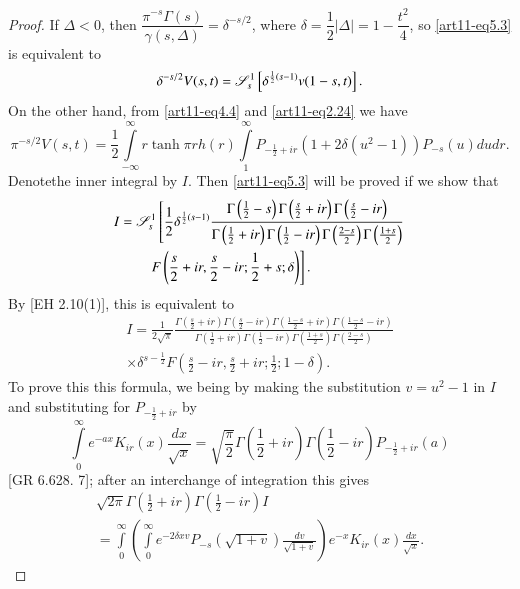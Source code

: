 \begin{proof}
If  $\Delta < 0$, then $\dfrac{\pi^{-s} \Gamma (s)}{\gamma (s, \Delta)} = \delta^{-s/2}$, where $\delta = \dfrac{1}{2} |\Delta| = 1 -\dfrac{t^2}{4}$, so \eqref{art11-eq5.3} is equivalent to 
$$
\delta^{-s/2} V (s,t) = \mathscr{S}^1_s \left[\delta^{\frac{1}{2} (s-1)}  v(1 - s, t)\right].
$$
On the other hand, from \eqref{art11-eq4.4} and \eqref{art11-eq2.24} we have 
$$
\pi^{-s/2} V (s,t) = \frac{1}{2} \int\limits^\infty_{-\infty} r \tanh \pi r h(r) \int\limits^\infty_{1} P_{-\frac{1}{2}+ ir} (1+ 2 \delta (u^2 -1)) P_{-s} (u) du dr. 
$$
Denote\pageoriginale the inner integral by $I$. Then \eqref{art11-eq5.3}  will be proved if we show that 
\begin{align*}
I & = \mathscr{S}^1_s \left[\frac{1}{2} \delta^{\frac{1}{2} (s-1)}\frac{\Gamma \left(\frac{1}{2} -s \right) \Gamma \left(\frac{s}{2} + ir \right) \Gamma \left(\frac{s}{2} - ir \right)}{\Gamma \left(\frac{1}{2} + ir \right) \Gamma \left(\frac{1}{2}  - ir \right) \Gamma \left(\frac{2-s}{2} \right) \Gamma \left(\frac{1+s}{2} \right)}   \right.\\
& \qquad \left. F \left(\frac{s}{2} + ir , \frac{s}{2} - ir; \frac{1}{2} + s ; \delta \right) \right].
\end{align*}
By [EH 2.10(1)], this is equivalent to 
\begin{gather*}
I = \frac{1}{2 \sqrt{\pi}} \frac{\Gamma \left(\frac{s}{2} + ir \right) \Gamma \left(\frac{s}{2} -ir \right) \Gamma \left(\frac{1-s}{2} + ir \right) \Gamma \left(\frac{1-s}{2} - ir \right)}{\Gamma \left(\frac{1}{2} +ir \right) \Gamma \left(\frac{1}{2} - ir \right) \Gamma \left(\frac{1+s}{2} \right) \Gamma \left(\frac{2-s}{2} \right)}\\
\times \delta^{s-\frac{1}{2}} F \left(\frac{s}{2}  - ir, \frac{s}{2} + ir; \frac{1}{2} ; 1-\delta \right).
\end{gather*}
To prove this this formula, we being by making the substitution $v = u^2 -1$ in $I$ and substituting for $P_{-\frac{1}{2} + ir}$ by 
$$
\int\limits^\infty_0 e^{-ax} K_{ir} (x) \frac{dx}{\sqrt{x}} = \sqrt{\frac{\pi}{2}} \Gamma \left(\frac{1}{2} + ir \right)\Gamma  \left(\frac{1}{2} - ir \right) P_{-\frac{1}{2} + ir} (a)
$$
[GR 6.628. 7]; after an interchange of integration this gives 
\begin{gather*}
\sqrt{2\pi} \Gamma \left(\frac{1}{2} + ir \right) \Gamma \left(\frac{1}{2} -ir \right) I\\
= \int\limits^\infty_0 \left(\int\limits^\infty_0 e^{-2\delta x v} P_{-s} (\sqrt{1+v}) \frac{dv}{\sqrt{1+v}} \right) e^{-x} K_{ir} (x) \frac{dx}{\sqrt{x}}.
\end{gather*}

\end{proof}

